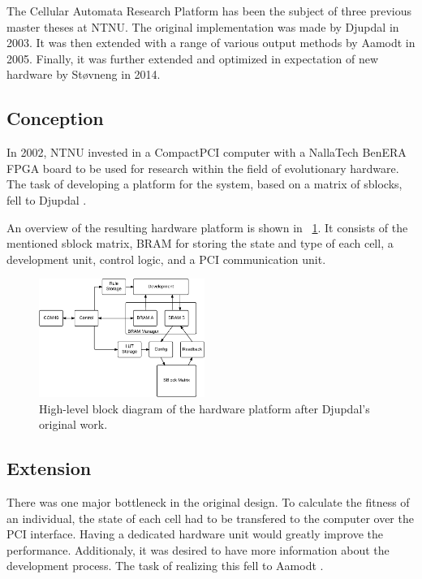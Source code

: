 The Cellular Automata Research Platform has been the subject of three previous master theses at NTNU.
The original implementation was made by Djupdal in 2003.
It was then extended with a range of various output methods by Aamodt in 2005.
Finally, it was further extended and optimized in expectation of new hardware by Støvneng in 2014.

\subsection{Conception}

In 2002, NTNU invested in a CompactPCI computer with a NallaTech BenERA FPGA board to be used for research within the field of evolutionary hardware.
The task of developing a platform for the system, based on a matrix of sblocks, fell to Djupdal \cite{djupdal2003sblock}.

An overview of the resulting hardware platform is shown in \figurename~\ref{fig:overview-djupdal}.
It consists of the mentioned sblock matrix, BRAM for storing the state and type of each cell, a development unit, control logic, and a PCI communication unit.

\begin{figure}[!ht]
    \centering
    \includegraphics[width=0.48\textwidth]{figures/overview-djupdal}
    \caption{High-level block diagram of the hardware platform after Djupdal's original work.}
    \label{fig:overview-djupdal}
\end{figure}



\subsection{Extension}

There was one major bottleneck in the original design.
To calculate the fitness of an individual, the state of each cell had to be transfered to the computer over the PCI interface.
Having a dedicated hardware unit would greatly improve the performance.
Additionaly, it was desired to have more information about the development process.
The task of realizing this fell to Aamodt \cite{aamodt2005sblock}.

